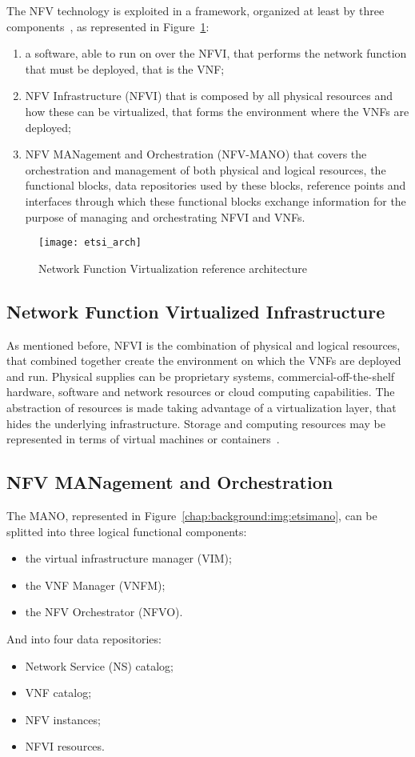 The NFV technology is exploited in a framework, organized
at least by three components~\cite{etsi2013gs}, as represented in
Figure~\ref{chap:background:img:etsi_arch}:
\begin{enumerate}
  \item a software, able to run on over the NFVI, that performs the network
  function that must be deployed, that is the VNF;
  \item NFV Infrastructure (NFVI) that is composed by all physical resources
  and how these can be virtualized, that forms the environment where the VNFs
  are deployed;
  \item NFV MANagement and Orchestration (NFV-MANO) that covers the
  orchestration and management of both physical and logical resources, the
  functional blocks, data repositories used by these blocks, reference points
  and interfaces through which these functional blocks exchange
  information for the purpose of managing and orchestrating NFVI and VNFs.
\end{enumerate}

\begin{figure}
  \centering
  \texttt{[image: etsi\_arch]}
  \caption{Network Function Virtualization reference
  architecture~\cite{etsi2013gs}}
  \label{chap:background:img:etsi_arch}
\end{figure}

\subsection{Network Function Virtualized Infrastructure}
As mentioned before, NFVI is the combination of physical and logical resources,
that combined together create the environment on which the VNFs are deployed
and run. Physical supplies can be proprietary systems, commercial-off-the-shelf
hardware, software and network resources or cloud computing capabilities. The
abstraction of resources is made taking advantage of a virtualization layer,
that hides the underlying infrastructure. Storage and computing resources may
be represented in terms of virtual machines or
containers~\cite{mijumbi2016network}.

\subsection{NFV MANagement and Orchestration}
The MANO, represented in Figure~\ref{chap:background:img:etsimano}, can be splitted into three logical functional components:
\begin{itemize}
  \item the virtual infrastructure manager (VIM);
  \item the VNF Manager (VNFM);
  \item the NFV Orchestrator (NFVO).
\end{itemize}
And into four data repositories:
\begin{itemize}
  \item Network Service (NS) catalog;
  \item VNF catalog;
  \item NFV instances;
  \item NFVI resources.
\end{itemize}

